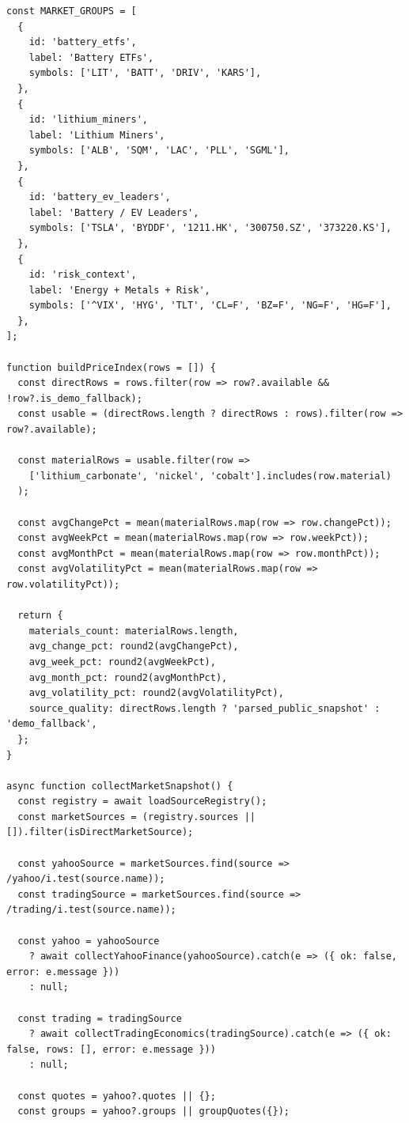 ﻿\documentclass[12pt,a4paper]{article}
\begin{document}
\begin{lstlisting}[style=projectcode,caption={市场价格代理指标与材料价格指数构建}]
const MARKET_GROUPS = [
  {
    id: 'battery_etfs',
    label: 'Battery ETFs',
    symbols: ['LIT', 'BATT', 'DRIV', 'KARS'],
  },
  {
    id: 'lithium_miners',
    label: 'Lithium Miners',
    symbols: ['ALB', 'SQM', 'LAC', 'PLL', 'SGML'],
  },
  {
    id: 'battery_ev_leaders',
    label: 'Battery / EV Leaders',
    symbols: ['TSLA', 'BYDDF', '1211.HK', '300750.SZ', '373220.KS'],
  },
  {
    id: 'risk_context',
    label: 'Energy + Metals + Risk',
    symbols: ['^VIX', 'HYG', 'TLT', 'CL=F', 'BZ=F', 'NG=F', 'HG=F'],
  },
];

function buildPriceIndex(rows = []) {
  const directRows = rows.filter(row => row?.available && !row?.is_demo_fallback);
  const usable = (directRows.length ? directRows : rows).filter(row => row?.available);

  const materialRows = usable.filter(row =>
    ['lithium_carbonate', 'nickel', 'cobalt'].includes(row.material)
  );

  const avgChangePct = mean(materialRows.map(row => row.changePct));
  const avgWeekPct = mean(materialRows.map(row => row.weekPct));
  const avgMonthPct = mean(materialRows.map(row => row.monthPct));
  const avgVolatilityPct = mean(materialRows.map(row => row.volatilityPct));

  return {
    materials_count: materialRows.length,
    avg_change_pct: round2(avgChangePct),
    avg_week_pct: round2(avgWeekPct),
    avg_month_pct: round2(avgMonthPct),
    avg_volatility_pct: round2(avgVolatilityPct),
    source_quality: directRows.length ? 'parsed_public_snapshot' : 'demo_fallback',
  };
}

async function collectMarketSnapshot() {
  const registry = await loadSourceRegistry();
  const marketSources = (registry.sources || []).filter(isDirectMarketSource);

  const yahooSource = marketSources.find(source => /yahoo/i.test(source.name));
  const tradingSource = marketSources.find(source => /trading/i.test(source.name));

  const yahoo = yahooSource
    ? await collectYahooFinance(yahooSource).catch(e => ({ ok: false, error: e.message }))
    : null;

  const trading = tradingSource
    ? await collectTradingEconomics(tradingSource).catch(e => ({ ok: false, rows: [], error: e.message }))
    : null;

  const quotes = yahoo?.quotes || {};
  const groups = yahoo?.groups || groupQuotes({});


\end{lstlisting}
\end{document}
